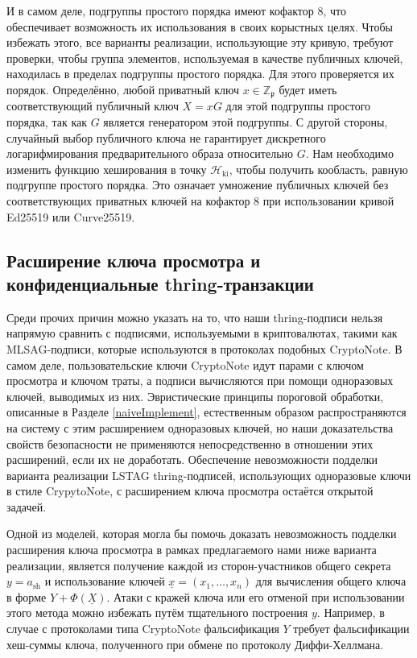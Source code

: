 \documentclass{mrl}
\theoremstyle{definition}
\numberwithin{theorem}{subsection}
\newcommand{\p}{\mathfrak{p}}
\begin{document}
И в самом деле, подгруппы простого порядка имеют кофактор $8$, что обеспечивает возможность их использования в своих корыстных целях. Чтобы избежать этого, все варианты реализации, использующие эту кривую, требуют проверки, чтобы группа элементов, используемая в качестве публичных ключей, находилась в пределах подгруппы простого порядка. Для этого проверяется их порядок. Определённо, любой приватный ключ $x \in \mathbb{Z}_\p$ будет иметь соответствующий публичный ключ $X = xG$ для этой подгруппы простого порядка, так как $G$ является генератором этой подгруппы. С другой стороны, случайный выбор публичного ключа не гарантирует дискретного логарифмирования предварительного образа относительно $G$. Нам необходимо изменить функцию хеширования в точку $\mathcal{H}_{\text{ki}}$, чтобы получить кообласть, равную подгруппе простого порядка. Это означает умножение публичных ключей без соответствующих приватных ключей на кофактор $8$ при использовании кривой Ed25519 или Curve25519.

\subsection{Расширение ключа просмотра и конфиденциальные thring-транзакции}

Среди прочих причин можно указать на то, что наши thring-подписи нельзя напрямую сравнить с подписями, используемыми в криптовалютах, такими как MLSAG-подписи, которые используются в протоколах подобных CryptoNote. В самом деле, пользовательские ключи CryptoNote идут парами с ключом просмотра и ключом траты, а подписи вычисляются при помощи одноразовых ключей, выводимых из них. Эвристические принципы пороговой обработки, описанные в Разделе \ref{naiveImplement}, естественным образом распространяются на систему с этим расширением одноразовых ключей, но наши доказательства свойств безопасности не применяются непосредственно в отношении этих расширений, если их не доработать. Обеспечение невозможности подделки варианта реализации LSTAG thring-подписей, использующих одноразовые ключи в стиле CrypytoNote, с расширением ключа просмотра остаётся открытой задачей.

Одной из моделей, которая могла бы помочь доказать невозможность подделки расширения ключа просмотра в рамках предлагаемого нами ниже варианта реализации, является получение каждой из сторон-участников общего секрета $y = a_{\text{sh}}$ и использование ключей $\underline{x} = (x_1, \ldots, x_n)$ для вычисления общего ключа в форме $Y + \Phi(\underline{X})$. Атаки с кражей ключа или его отменой при использовании этого метода можно избежать путём тщательного построения $y$. Например, в случае с протоколами типа CryptoNote фальсификация $Y$ требует фальсификации хеш-суммы ключа, полученного при обмене по протоколу Диффи-Хеллмана.
\end{document}
